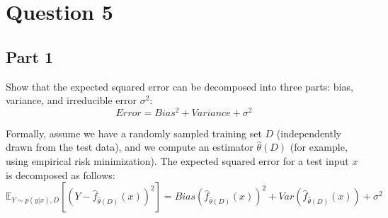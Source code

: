 \section{Question 5}
\subsection{Part 1}
Show that the expected squared error can be decomposed into three parts: bias, variance, and irreducible error \( \sigma^2 \):
\[
Error = Bias^2 + Variance + \sigma^2
\]

Formally, assume we have a randomly sampled training set \( D \) (independently drawn from the test data), and we compute an estimator \( \hat{\theta}(D) \) (for example, using empirical risk minimization). The expected squared error for a test input \( x \) is decomposed as follows:
\[
\mathbb{E}_{Y \sim p(y|x),D} \left[ (Y - \hat{f}_{\hat{\theta}(D)}(x))^2 \right] = Bias \left( \hat{f}_{\hat{\theta}(D)}(x) \right)^2 + Var \left( \hat{f}_{\hat{\theta}(D)}(x) \right) + \sigma^2
\]

